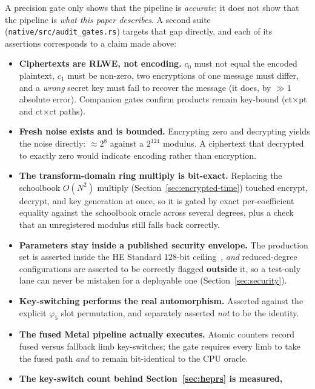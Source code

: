 \documentclass[11pt,a4paper]{article}
\DeclareRobustCommand{\file}[1]{\texttt{#1}}
\begin{document}
A precision gate only shows that the pipeline is \textit{accurate}; it does not
show that the pipeline is \textit{what this paper describes}. A second suite
(\file{native/src/audit\_gates.rs}) targets that gap directly, and each of its
assertions corresponds to a claim made above:
\begin{itemize}
  \item \textbf{Ciphertexts are RLWE, not encoding.}
        $c_0$ must not equal the encoded plaintext, $c_1$ must be non-zero, two
        encryptions of one message must differ, and a \textit{wrong} secret key
        must fail to recover the message (it does, by $\gg 1$ absolute error).
        Companion gates confirm products remain key-bound (ct$\times$pt and
        ct$\times$ct paths).
  \item \textbf{Fresh noise exists and is bounded.}
        Encrypting zero and decrypting yields the noise directly:
        $\approx 2^{8}$ against a $2^{124}$ modulus. A ciphertext that decrypted
        to exactly zero would indicate encoding rather than encryption.
  \item \textbf{The transform-domain ring multiply is bit-exact.}
        Replacing the schoolbook $O(N^2)$ multiply
        (Section~\ref{sec:encrypted-time}) touched encrypt, decrypt, and key
        generation at once, so it is gated by exact per-coefficient equality
        against the schoolbook oracle across several degrees, plus a check that an
        unregistered modulus still falls back correctly.
  \item \textbf{Parameters stay inside a published security envelope.}
        The production set is asserted inside the HE Standard 128-bit
        ceiling~\cite{hestandard2018}, \textit{and} reduced-degree configurations
        are asserted to be correctly flagged \textbf{outside} it, so a test-only
        lane can never be mistaken for a deployable one
        (Section~\ref{sec:security}).
  \item \textbf{Key-switching performs the real automorphism.}
        Asserted against the explicit $\varphi_5$ slot permutation, and separately
        asserted \textit{not} to be the identity.
  \item \textbf{The fused Metal pipeline actually executes.}
        Atomic counters record fused versus fallback limb key-switches; the gate
        requires every limb to take the fused path \textit{and} to remain
        bit-identical to the CPU oracle.
  \item \textbf{The key-switch count behind Section~\ref{sec:heprs} is measured,
}
\end{itemize}
\end{document}
